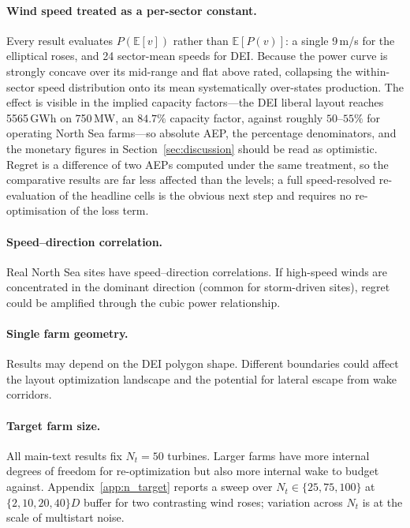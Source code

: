 \documentclass[wes, manuscript]{copernicus}
\begin{document}
\paragraph{Wind speed treated as a per-sector constant.}
Every result evaluates $P(\mathbb{E}[v])$ rather than $\mathbb{E}[P(v)]$: a single 9\,m/s for the elliptical roses, and 24 sector-mean speeds for DEI.
Because the power curve is strongly concave over its mid-range and flat above rated, collapsing the within-sector speed distribution onto its mean systematically over-states production.
The effect is visible in the implied capacity factors---the DEI liberal layout reaches 5565\,GWh on 750\,MW, an $84.7\%$ capacity factor, against roughly $50$--$55\%$ for operating North Sea farms---so absolute AEP, the percentage denominators, and the monetary figures in Section~\ref{sec:discussion} should be read as optimistic.
Regret is a difference of two AEPs computed under the same treatment, so the comparative results are far less affected than the levels; a full speed-resolved re-evaluation of the headline cells is the obvious next step and requires no re-optimisation of the loss term.

\paragraph{Speed--direction correlation.}
Real North Sea sites have speed--direction correlations.
If high-speed winds are concentrated in the dominant direction (common for storm-driven sites), regret could be amplified through the cubic power relationship.

\paragraph{Single farm geometry.}
Results may depend on the DEI polygon shape.
Different boundaries could affect the layout optimization landscape and the potential for lateral escape from wake corridors.

\paragraph{Target farm size.}
All main-text results fix $N_t = 50$ turbines.
Larger farms have more internal degrees of freedom for re-optimization but also more internal wake to budget against.
Appendix~\ref{app:n_target} reports a sweep over $N_t \in \{25, 75, 100\}$ at $\{2, 10, 20, 40\}D$ buffer for two contrasting wind roses; variation across $N_t$ is at the scale of multistart noise.
\end{document}
